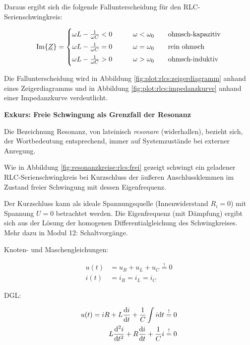 \begin{frame}
{    Daraus ergibt sich die folgende Fallunterscheidung für den RLC-Serienschwingkreis:

    \begin{equation}
        \Im\{\underline{Z}\} =
    \begin{cases}
        \omega L - \frac{1}{\omega C} < 0 & \qquad \omega < \omega_0 \qquad\text{ohmsch-kapazitiv}\vphantom{\Big|}\\
        \omega L - \frac{1}{\omega C} = 0 & \qquad \omega = \omega_0 \qquad\text{rein ohmsch}\vphantom{\Big|}\\
        \omega L - \frac{1}{\omega C} > 0 & \qquad \omega > \omega_0 \qquad\text{ohmsch-induktiv}\vphantom{\Big|}
    \end{cases}
    \label{eq:rlcs:fallunterscheidung}
    \end{equation}

    Die Fallunterscheidung wird in Abbildung \ref{fig:plot:rlcs:zeigerdiagramm} anhand eines Zeigerdiagramms 
    und in Abbildung \ref{fig:plot:rlcs:impedanzkurve} anhand einer Impedanzkurve verdeutlicht.

    \textbf{Exkurs: Freie Schwingung als Grenzfall der Resonanz} %
    
    Die Bezeichnung Resonanz, von lateinisch \textit{resonare} (widerhallen), 
    bezieht sich, der Wortbedeutung entsprechend, immer auf Systemzustände bei externer Anregung.

    Wie in Abbildung \ref{fig:resonanzkreise:rlcs:frei} gezeigt 
    schwingt ein geladener RLC-Serienschwingkreis bei Kurzschluss der äußeren Anschlussklemmen im Zustand freier Schwingung mit dessen Eigenfrequenz.
    
    Der Kurzschluss kann als ideale Spannungsquelle (Innenwiderstand $R_i=0$) mit Spannung $U=0$ betrachtet werden.
    Die Eigenfrequenz (mit Dämpfung) ergibt sich aus der Lösung der homogenen Differentialgleichung des Schwingkreises. 
    Mehr dazu in Modul 12: Schaltvorgänge.%
        
    Knoten- und Maschengleichungen:

    \begin{align*}
        u(t) &= u_R + u_L + u_C \overset{!}{=} 0 \\
        i(t) &= i_R = i_L = i_C
    \end{align*}
  
    DGL:

    \begin{align*}u(t)=
        i R + L \frac{\mathrm{d} i}{\mathrm{d} t} + \frac{1}{C} \int i \mathrm{d} t &\overset{!}{=} 0 \\
        L \frac{\mathrm{d}^2i}{\mathrm{d} t^2} + R \frac{\mathrm{d}i}{\mathrm{d} t} + \frac{1}{C} i &\overset{!}{=} 0 
    \end{align*}

}
\end{frame}
